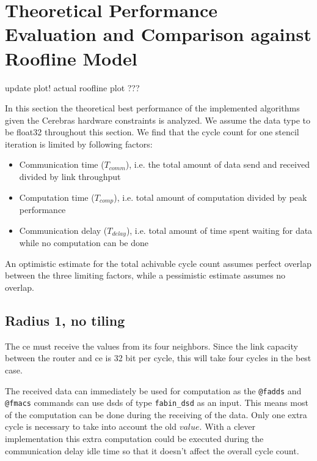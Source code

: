 \chapter{Theoretical Performance Evaluation and Comparison against Roofline Model}
\label{sec:theory_performance}



update plot!
actual roofline plot ???

In this section the theoretical best performance of the implemented algorithms given the Cerebras hardware constraints is analyzed.
We assume the data type to be float32 throughout this section.
We find that the cycle count for one stencil iteration is limited by following factors:
\begin{itemize}
    \item Communication time ($T_{comm}$), i.e. the total amount of data send and received divided by link throughput
    \item Computation time ($T_{comp}$), i.e. total amount of computation divided by peak performance
    \item Communication delay ($T_{delay}$), i.e. total amount of time spent waiting for data while no computation can be done
\end{itemize}

An optimistic estimate for the total achivable cycle count assumes perfect overlap between the three limiting factors, while a pessimistic estimate assumes no overlap.



\section{Radius 1, no tiling}
The \ac{ce} must receive the values from its four neighbors. Since the link capacity between the router and \ac{ce} is 32 bit per cycle, this will take four cycles in the best case.

The received data can immediately be used for computation as the \texttt{@fadds} and \texttt{@fmacs} commands can use dsds of type \texttt{fabin\_dsd} as an input. This means most of the computation can be done during the receiving of the data. Only one extra cycle is necessary to take into account the old $value$. With a clever implementation this extra computation could be executed during the communication delay idle time so that it doesn't affect the overall cycle count.

